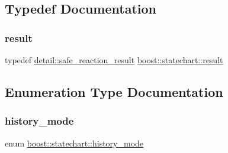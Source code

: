 \subsection{Typedef Documentation}
\mbox{\label{namespaceboost_1_1statechart_abe807f6598b614d6d87bb951ecd92331}} 
\subsubsection{\texorpdfstring{result}{result}}
{\footnotesize\ttfamily typedef \mbox{\hyperlink{classboost_1_1statechart_1_1detail_1_1safe__reaction__result}{detail\+::safe\+\_\+reaction\+\_\+result}} \mbox{\hyperlink{namespaceboost_1_1statechart_abe807f6598b614d6d87bb951ecd92331}{boost\+::statechart\+::result}}}



\subsection{Enumeration Type Documentation}
\mbox{\label{namespaceboost_1_1statechart_a9c4ec64d7a0422b8b9c97b489f731372}} 
\subsubsection{\texorpdfstring{history\+\_\+mode}{history\_mode}}
{\footnotesize\ttfamily enum \mbox{\hyperlink{namespaceboost_1_1statechart_a9c4ec64d7a0422b8b9c97b489f731372}{boost\+::statechart\+::history\+\_\+mode}}}

